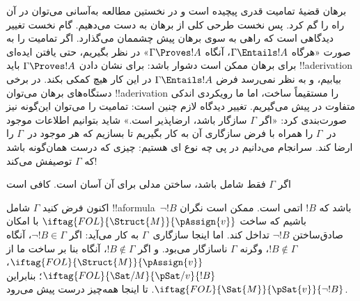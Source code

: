 \documentclass[../../../include/open-logic-section]{subfiles}
\begin{document}
      {}
      {}


برهان قضیهٔ تمامیت قدری پیچیده است و در نخستین مطالعه به‌آسانی می‌توان
در آن راه را گم کرد. پس نخست طرحی کلی از برهان به دست می‌دهیم. گام نخست
تغییر دیدگاهی است که راهی به سوی برهان پیش چشممان می‌گذارد. اگر تمامیت
را به صورت «هرگاه $\Gamma \Entails !A$، آنگاه $\Gamma \Proves !A$» در
نظر بگیریم، حتی یافتن ایده‌ای برای برهان ممکن است دشوار باشد: برای نشان
دادن $\Gamma \Proves !A$ باید !!a{derivation} بیابیم، و به نظر نمی‌رسد
فرض $\Gamma \Entails !A$ در این کار هیچ کمکی بکند. در برخی دستگاه‌های
برهان می‌توان !!a{derivation} را مستقیماً ساخت، اما ما رویکردی اندکی
متفاوت در پیش می‌گیریم. تغییر دیدگاه لازم چنین است: تمامیت را می‌توان
این‌گونه نیز صورت‌بندی کرد: «اگر $\Gamma$ سازگار باشد، ارضاپذیر است.»
شاید بتوانیم اطلاعات موجود در~$\Gamma$ را همراه با فرض سازگاری آن به کار
بگیریم تا  بسازیم که هر
 موجود در~$\Gamma$ را ارضا کند.
سرانجام می‌دانیم در پی چه نوع
ای هستیم: چیزی که درست همان‌گونه
باشد که $\Gamma$ توصیفش می‌کند!{}

اگر $\Gamma$ فقط شامل  باشد، ساختن مدلی برای آن آسان
است. کافی است

اکنون فرض کنید $\Gamma$ شامل !!a{formula}~$\lnot !B$ باشد که $!B$ اتمی
است. ممکن است نگران باشیم که ساخت
$\iftag{FOL}{\Struct{M}}{\pAssign{v}}$ با امکان صادق‌ساختن $\lnot !B$
تداخل کند. اما اینجا سازگاری~$\Gamma$ به کار می‌آید: اگر
$\lnot !B \in \Gamma$، آنگاه $!B \notin \Gamma$، وگرنه $\Gamma$
ناسازگار می‌بود. و اگر $!B \notin \Gamma$، آنگاه بنا بر ساخت ما از
$\iftag{FOL}{\Struct{M}}{\pAssign{v}}$،
$\iftag{FOL}{\Sat/{M}}{\pSat/{v}}{!B}$؛ بنابراین
$\iftag{FOL}{\Sat{M}}{\pSat{v}}{\lnot !B}$. تا اینجا همه‌چیز درست پیش
می‌رود.
\end{document}
